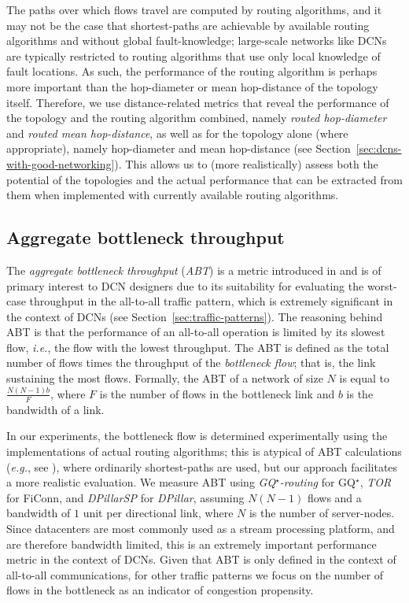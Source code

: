 \documentclass[]{amsart}
\begin{document}
The paths over which flows travel are computed by routing algorithms, and it may not be the case that shortest-paths are achievable by available routing algorithms and without global fault-knowledge; large-scale networks like DCNs are typically restricted to routing algorithms that use only local knowledge of fault locations. As such, the performance of the routing algorithm is perhaps more important than the hop-diameter or mean hop-distance of the topology itself.  Therefore, we use distance-related metrics that reveal the performance of the topology and the routing algorithm combined, namely \emph{routed hop-diameter\/} and \emph{routed mean hop-distance\/}, as well as for the topology alone (where appropriate), namely hop-diameter and mean hop-distance (see Section~\ref{sec:dcns-with-good-networking}).  This allows us to (more realistically) assess both the potential of the topologies and the actual performance that can be extracted from them when implemented with currently available routing algorithms.


\subsection{Aggregate bottleneck throughput}
\label{sec:abt}
The \emph{aggregate bottleneck throughput\/} (\emph{ABT\/}) is a metric introduced in \cite{GuoLuLi2009} and is of primary interest to DCN designers due to its suitability for evaluating the worst-case throughput in the all-to-all traffic pattern, which is extremely significant in the context of DCNs (see Section~\ref{sec:traffic-patterns}).  The reasoning behind ABT is that the performance of an all-to-all operation is limited by its slowest flow, \emph{i.e.}, the flow with the lowest throughput.  The ABT is defined as the total number of flows times the throughput of the \emph{bottleneck flow\/}; that is, the link sustaining the most flows.  Formally, the ABT of a network of size $N$
is equal to $\frac{N(N-1)b}{F}$, where $F$ is the number of flows in the bottleneck link and $b$ is the bandwidth of a link.

In our experiments, the bottleneck flow is determined experimentally using the implementations of actual routing algorithms; this is atypical of ABT calculations (\emph{e.g.\/}, see \cite{LiuMuppalaVeeraraghavan2013}), where ordinarily shortest-paths are used, but our approach facilitates a more realistic evaluation.  We measure ABT using \emph{GQ$^\star$-routing\/} for GQ$^\star$, \emph{TOR\/} for FiConn, and \emph{DPillarSP\/} for \emph{DPillar\/}, assuming $N(N - 1)$ flows and a bandwidth of $1$ unit per directional link, where $N$ is the number of server-nodes.  Since datacenters are most commonly used as a stream processing platform, and are therefore bandwidth limited, this is an extremely important performance metric in the context of DCNs.  Given that ABT is only defined in the context of all-to-all communications, for other traffic patterns we focus on the number of flows in the bottleneck as an indicator of congestion propensity.
\end{document}
